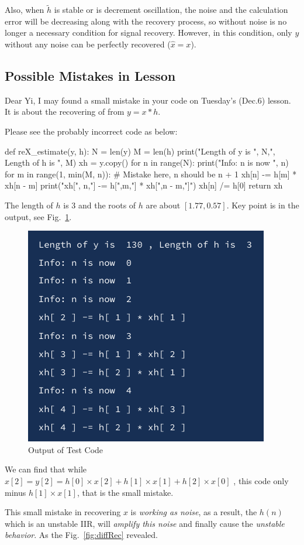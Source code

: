 \documentclass{article}
\begin{document}
Also, when $\tilde{h}$ is stable or is decrement oscillation, the noise and the calculation error will be decreasing along with the recovery process, so without noise is no longer a necessary condition for signal recovery. However, in this condition, only $y$ without any noise can be perfectly recovered ($\hat{x} = x$).




\begin{appendices}
\section{Possible Mistakes in Lesson}
Dear Yi, I may found a small mistake in your code on Tuesday's (Dec.6) lesson. It is about the recovering of
from $y = x * h$. 

Please see the probably incorrect code as below:
\begin{python}
def reX_estimate(y, h):
	N = len(y)
	M = len(h)
	print("Length of y is ", N,", Length of h is ", M)
	xh = y.copy()
	for n in range(N):
		print("Info: n is now ", n)
		for m in range(1, min(M, n)): # Mistake here, n should be n + 1
			xh[n] -= h[m] * xh[n - m]
			print("xh[", n,"] -= h[",m,"] * xh[",n - m,"]")
		xh[n] /= h[0]
	return xh
\end{python}

The length of $h$ is $3$ and the roots of $h$ are about $[1.77, 0.57]$. Key point is in the output, see Fig.~\ref{fig:output}.

\begin{figure}[!h]
	\centering
	\includegraphics[width=2 in]{../pic/comparisonOutput.png}
	\caption{Output of Test Code}
	\label{fig:output}
\end{figure}

We can find that while $\hat{x}[2] = y[2] = h[0] \times x[2] + h[1]\times x[1] + h[2] \times x[0]$ , this code only minus $h[1] \times x[1]$, that is the small mistake.

This small mistake in recovering $x$ is \emph{working as noise}, as a result, the $h(n)$ which is an unstable IIR, will \emph{amplify this noise} and finally cause the \emph{unstable behavior}. As the Fig.~\ref{fig:diffRec} revealed.


\end{appendices}
\end{document}
